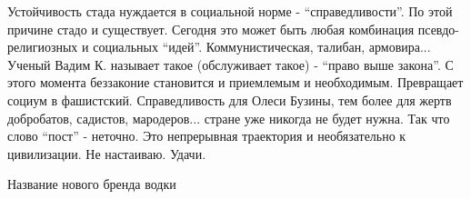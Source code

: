 \begin{itemize}

Устойчивость стада нуждается в социальной норме - \enquote{справедливости}. По этой
причине стадо и существует. Сегодня это может быть любая комбинация
псевдо-религиозных и социальных \enquote{идей}. Коммунистическая, талибан, армовира...
Ученый Вадим К. называет такое (обслуживает такое) - \enquote{право выше закона}. С
этого момента беззаконие становится и приемлемым и необходимым. Превращает
социум в фашистский. Справедливость для Олеси Бузины, тем более для жертв
добробатов, садистов, мародеров... стране уже никогда не будет нужна. Так что
слово \enquote{пост} - неточно. Это непрерывная траектория и необязательно к
цивилизации. Не настаиваю. Удачи.

Название нового бренда водки

\end{itemize} %
